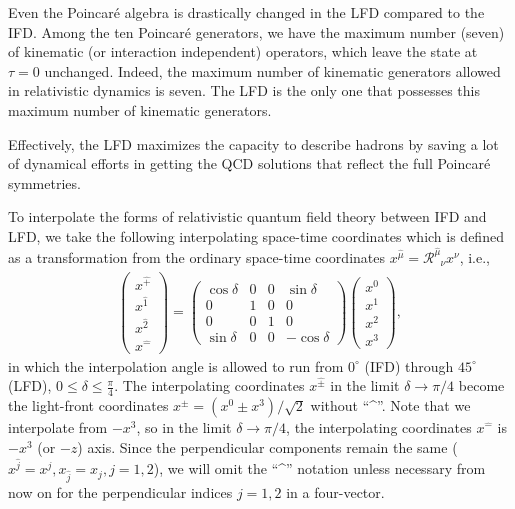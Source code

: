 \documentclass[aps,reprint,notitlepage,nofootinbib,superscriptaddress]{revtex4-1}
\newcommand{\muT}{\hat{\mu}}
\newcommand{\itP}[1]{\hat{#1}}
\begin{document}
Even the Poincar\'e algebra is drastically changed in the LFD compared to the IFD.
Among the ten Poincar\'e generators, we have the maximum number (seven) of kinematic (or interaction independent) operators, which leave the state at $\tau=0$ unchanged. Indeed, the maximum number of kinematic generators allowed in relativistic dynamics is seven. The LFD is the only one that possesses this maximum number of kinematic generators.

Effectively, the LFD maximizes the capacity to
describe hadrons by saving a lot of dynamical efforts in getting the QCD solutions that reflect the full Poincar\'e symmetries.

To interpolate the forms of relativistic quantum field theory between IFD and LFD, we take the following interpolating space-time coordinates  \cite{Ji2001, Hornbostel1992, Ji1996, Ji2012, Ji2015EM, Ji2015SP, Ji2018QED, Ji2021QCD} which is defined as a transformation from the ordinary space-time coordinates $x^{\muT}=\mathcal{R}^{\muT}_{\phantom{\mu}{\nu}}x^{\nu}$, i.e.,
\begin{align}\label{eqn:interpolation_angle_definition}
  \begin{pmatrix}
    x^{\hat{+}}\\
    x^{\hat{1}}\\
    x^{\hat{2}}\\
    x^{\hat{-}}
  \end{pmatrix}=
  \begin{pmatrix}
    \cos\delta & 0  & 0  & \sin\delta \\
    0          & 1  & 0  & 0 \\
    0          & 0  & 1  & 0 \\
    \sin\delta & 0  & 0  & -\cos\delta
  \end{pmatrix}
  \begin{pmatrix}
    x^{0}\\
    x^{1}\\
    x^{2}\\
    x^{3}
  \end{pmatrix},
\end{align}
in which the interpolation angle is allowed to run from $0^\circ$ (IFD) through $45^\circ$ (LFD), $0\le \delta \le \frac{\pi}{4}$. The interpolating coordinates $x^{\itP{\pm}}$ in the limit $\delta\rightarrow\pi/4$ become the light-front coordinates $x^{\pm}=(x^{0}\pm x^{3})/\sqrt{2}$ without  ``\textasciicircum''. Note that we interpolate from $-x^3$, so in the limit $\delta\rightarrow\pi/4$, the interpolating coordinates $x^{\itP{-}}$ is $-x^3$ (or $-z$) axis. Since the perpendicular components remain the same ($x^{\itP{j}}=x^{j},x_{\itP{j}}=x_{j}, j=1,2$), we will omit the ``\textasciicircum''  notation unless necessary from now on for the perpendicular indices $j=1,2$ in a four-vector.
\end{document}
